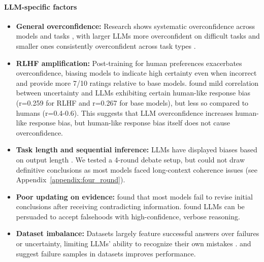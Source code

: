 \documentclass{article}
\begin{document}
\paragraph{LLM-specific factors}
\begin{itemize}
    \item \textbf{General overconfidence:} Research shows systematic overconfidence across models and tasks \citep{chhikara2025mindconfidencegapoverconfidence,xiong2024uncertainty}, with larger LLMs more overconfident on difficult tasks and smaller ones consistently overconfident across task types \citep{wen2024from}.

    \item \textbf{RLHF amplification:} Post-training for human preferences exacerbates overconfidence, biasing models to indicate high certainty even when incorrect \citep{leng2025tamingoverconfidencellmsreward} and provide more 7/10 ratings \citep{west2025basemodelsbeataligned,openai2024gpt4technicalreport} relative to base models. \citet{tjuatja2024llmsexhibithumanlikeresponse} found mild correlation between uncertainty and LLMs exhibiting certain human-like response bias (r=0.259 for RLHF and r=0.267 for base models), but less so compared to humans (r=0.4-0.6). This suggests that LLM overconfidence increases human-like response bias, but human-like response bias itself does not cause overconfidence.
    
    \item \textbf{Task length and sequential inference:} LLMs have displayed biases based on output length \citep{liu2025understandingr1zeroliketrainingcritical}. We tested a 4-round debate setup, but could not draw definitive conclusions as most models faced long-context coherence issues (see Appendix~\ref{appendix:four_round}).

    \item \textbf{Poor updating on evidence:} \citet{wilie2024beliefrevisionadaptabilitylarge} found that most models fail to revise initial conclusions after receiving contradicting information. \citet{agarwal2025persuasionoverridestruthmultiagent} found LLMs can be persuaded to accept falsehoods with high-confidence, verbose reasoning.

    \item \textbf{Dataset imbalance:} Datasets largely feature successful answers over failures or uncertainty, limiting LLMs' ability to recognize their own mistakes \citep{zhou2023navigatinggreyareaexpressions}. \citet{chung2025learningfailuresmultiattemptreinforcement} and \cite{stechly2025semanticsunreasonableeffectivenessreasonless} suggest failure samples in datasets improves performance.
\end{itemize}
\end{document}
